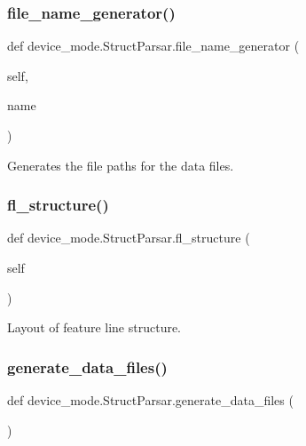 \subsubsection{\texorpdfstring{file\+\_\+name\+\_\+generator()}{file\_name\_generator()}}
{\footnotesize\ttfamily def device\+\_\+mode.\+Struct\+Parsar.\+file\+\_\+name\+\_\+generator (\begin{DoxyParamCaption}\item[{}]{self,  }\item[{}]{name }\end{DoxyParamCaption})}

\begin{DoxyVerb}Generates the file paths for the data files.
\end{DoxyVerb}
 \mbox{\label{classdevice__mode_1_1StructParsar_a27f6ebed8dceb8e44d29294383288ea3}} 
\subsubsection{\texorpdfstring{fl\+\_\+structure()}{fl\_structure()}}
{\footnotesize\ttfamily def device\+\_\+mode.\+Struct\+Parsar.\+fl\+\_\+structure (\begin{DoxyParamCaption}\item[{}]{self }\end{DoxyParamCaption})}

\begin{DoxyVerb}Layout of feature line structure.
\end{DoxyVerb}
 \mbox{\label{classdevice__mode_1_1StructParsar_ae57ed24c72707985427085a6ba87087c}} 
\subsubsection{\texorpdfstring{generate\+\_\+data\+\_\+files()}{generate\_data\_files()}}
{\footnotesize\ttfamily def device\+\_\+mode.\+Struct\+Parsar.\+generate\+\_\+data\+\_\+files (\begin{DoxyParamCaption}{ }\end{DoxyParamCaption})}

